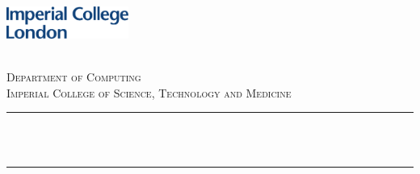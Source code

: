 \begin{titlepage}

    \newcommand{\HRule}{\rule{\linewidth}{0.5mm}} %
    
    
    \includegraphics[width = 4cm]{../figures/imperial.pdf}\\[0.5cm] 
    
    \center %
     
    
    \textsc{\LARGE \reporttype}\\[1.5cm] 
    \textsc{\Large Department of Computing}\\[0.5cm] 
    \textsc{\large Imperial College of Science, Technology and Medicine}\\[0.5cm] 
    
    
    \HRule \\[0.4cm]
    { \huge \bfseries \reporttitle}\\ %
    \HRule \\[1.5cm]
     
    

\end{titlepage}
